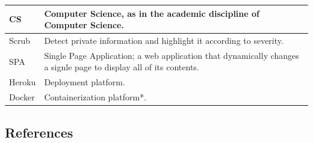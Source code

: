 \documentclass[11pt]{article}
\begin{document}
\begin{tabular}{ |p{2cm}|p{14.7cm}| }
	\hline
	CS                   & Computer Science, as in the academic discipline of Computer Science.                                                                                                                                                                                                                                                                                                                                                     \\
	\hline
	Scrub                & Detect private information and highlight it according to severity.                                                                                                                                                                                                                                                                                                                                                       \\
	\hline
	SPA                  & Single Page Application; a web application that dynamically changes a signle page to display all of its contents.                                                                                                                                                                                                                                                                                                        \\
	\hline
	Heroku               & Deployment platform.                                                                                                                                                                                                                                                                                                                                                                                                     \\
	\hline
	Docker               & Containerization platform*.                                                                                                                                                                                                                                                                                                                                                                                              \\
	\hline
\end{tabular}

\subsection{References}


\end{document}
